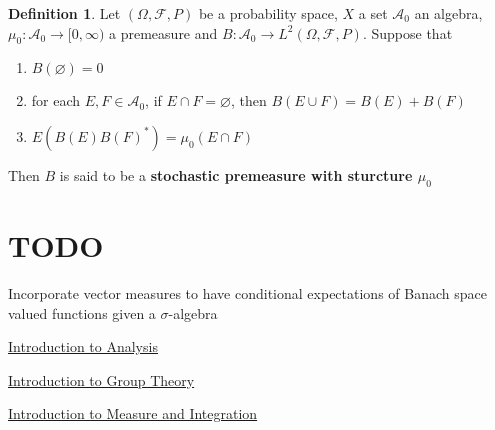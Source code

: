 \documentclass[12pt]{amsart}
\theoremstyle{definition}
\newtheorem{defn}[definition]{Definition}
\newcommand{\sig}{\sigma}
\newcommand{\Om}{\Omega}
\newcommand{\MA}{\mathcal{A}}
\newcommand{\MF}{\mathcal{F}}
\newcommand{\Rg}{[0,\infty)}
\begin{document}
	\begin{defn}
	Let $(\Om, \MF, P)$ be a probability space, $X$ a set $\MA_0$ an algebra, $\mu_0:\MA_0 \rightarrow \Rg$ a premeasure and $B:\MA_0 \rightarrow L^2(\Om, \MF, P)$. 
	Suppose that 
	\begin{enumerate}
	\item $B(\varnothing) = 0$
	\item for each $E, F \in \MA_0$, if $E \cap F = \varnothing$, then $B(E \cup F) = B(E) + B(F)$
	\item $E (B(E)B(F)^*) = \mu_0(E \cap F)$
	\end{enumerate}
	Then $B$ is said to be a \textbf{stochastic premeasure with sturcture $\mu_0$}
	
	\end{defn}
	





















	\newpage
		\section{TODO}
	Incorporate vector measures to have conditional expectations of Banach space valued functions given a $\sig$-algebra
	

	
	
	
	
	
	\newpage
	\begin{thebibliography}{4}
  \href{https://github.com/carsonaj/Mathematics/blob/master/Introduction\%20to\%20Analysis/Introduction\%20to\%20Analysis.pdf}{Introduction to Analysis}	
	
 \href{https://github.com/carsonaj/Mathematics/tree/master/Introduction\%20to\%20Group\%20Theory}{Introduction to Group Theory}

  \href{https://github.com/carsonaj/Mathematics/blob/master/Introduction\%20to\%20Measure\%20and\%20Integration/Introduction\%20to\%20Measure\%20and\%20Integration.pdf}{Introduction to Measure and Integration}


\end{thebibliography}
	
	
\end{document}
